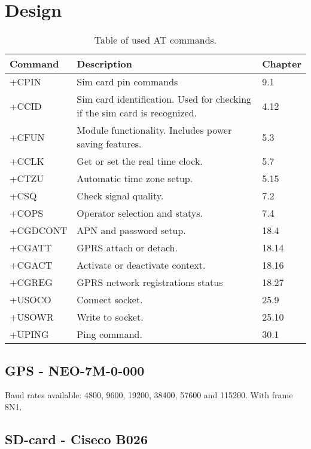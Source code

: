 
\chapter{Design}
\label{ch:Design}

\begin{table}[H]
	\begin{tabularx}{\textwidth}{l X X}
		\toprule
		Command & Description & Chapter \\
		\midrule
		+CPIN & Sim card pin commands & 9.1 \\
		+CCID & Sim card identification. Used for checking if the sim card is recognized. & 4.12 \\
		+CFUN & Module functionality. Includes power saving features. & 5.3 \\
		+CCLK & Get or set the real time clock. & 5.7 \\
		+CTZU & Automatic time zone setup. & 5.15 \\
		+CSQ & Check signal quality. & 7.2 \\
		+COPS & Operator selection and statys. & 7.4 \\
		+CGDCONT & APN and password setup. & 18.4 \\
		+CGATT & GPRS attach or detach. & 18.14 \\
		+CGACT & Activate or deactivate context. & 18.16 \\
		+CGREG & GPRS network registrations status & 18.27 \\
		+USOCO & Connect socket. & 25.9 \\
		+USOWR & Write to socket. & 25.10 \\
		+UPING & Ping command. & 30.1 \\
		\bottomrule
	\end{tabularx}
	\caption{Table of used AT commands.}
	\label{tab:ATcomm}
\end{table}

\section{GPS - NEO-7M-0-000}
Baud rates available: \num{4800}, \num{9600}, \num{19200}, \num{38400}, \num{57600} and \num{115200}. With frame 8N1.

\cite{MKRSchem}

\section{SD-card - Ciseco B026}

\FloatBarrier
